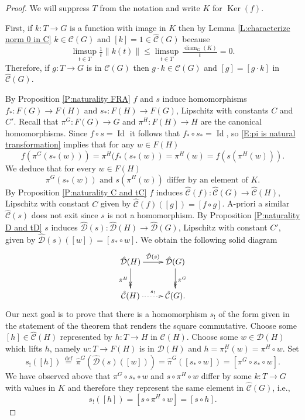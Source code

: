 \documentclass[12pt]{amsart}
\theoremstyle{definition}
\newcommand{\C}[1]{\mathcal{#1}}
\newcommand{\OP}[1]{\operatorname{#1}}
\def\Free{F}
\def\D{\mathcal{D}}
\def\tC{\hat{\mathcal{C}}}
\def\tD{\hat{\D}}
\begin{document}
\begin{proof}
We will suppress $T$ from the notation and write $K$ for $\OP{Ker}(f)$.





First, if $k \colon T \to G$ is a function with image in $K$ then by Lemma \ref{L:characterize norm 0 in C}  $k \in \C C(G)$ and $[k]=1 \in \tC(G)$ because
\[
\limsup_{t \in T} \tfrac{1}{t} \|k(t)\| \leq \limsup_{t \in T} \, \tfrac{\OP{diam}_G(K)}{t} = 0.
\]
Therefore, if $g \colon T \to G$ is in $\C C(G)$ then $g \cdot k \in \C C(G)$ and $[g]=[g \cdot k]$ in $\tC(G)$.

By Proposition \ref{P:naturality FRA} $f$ and $s$ induce homomorphisms $f_* \colon \Free(G) \to \Free(H)$ and $s_* \colon \Free(H) \to \Free(G)$, Lipschitz with constants $C$ and $C'$.
Recall that $\pi^G \colon \Free(G) \to G$ and $\pi^H \colon \Free(H) \to H$ are the canonical homomorphisms.
Since $f \circ s=\OP{Id}$ it follows that $f_* \circ s_*=\OP{Id}$, so \eqref{E:pi is natural transformation} implies that for any $w \in \Free(H)$
\[
f(\pi^G(s_*(w))) = \pi^H(f_*(s_*(w)) = \pi^H(w) = f(s(\pi^H(w))).
\]
We deduce that for every $w \in \Free(H)$
\[
\text{$\pi^G(s_*(w))$ and $s(\pi^H(w))$ differ by an element of $K$.}
\]
By Proposition \ref{P:naturality C and tC} $f$ induces $\tC(f) \colon \tC(G) \to \tC(H)$, Lipschitz with constant $C$ given by $\tC(f)([g])=[f \circ g]$.
A-priori a similar $\tC(s)$ does not exit since $s$ is not a homomorphism.
By Proposition \ref{P:naturality D and tD} $s$ induces  $\tD(s) \colon \tD(H) \to \tD(G)$, Lipschitz with constant $C'$, given by $\tD(s)([w])=[s_* \circ w]$.
We obtain the following solid diagram
\[
\xymatrix{
\tD(H) \ar[r]^{\tD(s)} \ar@{->>}[d]_{\hat{\pi}^H} &
\tD(G) \ar@{->>}[d]^{\hat{\pi}^G} 
\\
\tC(H) \ar@{..>}[r]^{s_!} &
\tC(G).
}
\]
Our next goal is to prove that there is a homomorphism $s_!$ of the form given in the statement of the theorem that renders the square commutative.
Choose some $[h] \in \tC(H)$ represented by $h \colon T \to H$ in $\C C(H)$.
Choose some $w \in \C D(H)$ which lifts $h$, namely $w \colon T \to \Free(H)$ is in $\C D(H)$ and $h= \pi^H_*(w) = \pi^H \circ w$.
Set
\[
s_!([h]) \, \overset{\text{def}}{=} \, \hat{\pi}^G(\tD(s)([w]))=\hat{\pi}^G([s_* \circ w])=[\pi^G \circ s_* \circ w].
\]
We have observed above that $\pi^G \circ s_* \circ w$ and $s \circ \pi^H \circ w$ differ by some $k \colon T \to G$ with values in $K$ and therefore they represent the same element in $\tC(G)$, i.e.,
\[
s_!([h]) = [s \circ \pi^H \circ w] = [s \circ h].
\]
\end{proof}
\end{document}
